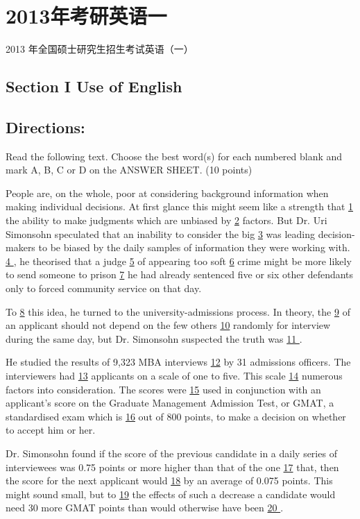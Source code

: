 \documentclass[UTF8,11pt]{ctexart}
\begin{document}
\section*{2013年考研英语一}
2013 年全国硕士研究生招生考试英语（一）


\subsection*{\textbf{Section I Use of English}}


\subsection*{\textbf{Directions:}}


Read the following text. Choose the best word(s) for each numbered blank and mark A, B, C or D on the ANSWER SHEET. (10 points)


People are, on the whole, poor at considering background information when making individual decisions. At first glance this might seem like a strength that \uline{1} the ability to make judgments which are unbiased by \uline{2} factors. But Dr. Uri Simonsohn speculated that an inability to consider the big \uline{3} was leading decision-makers to be biased by the daily samples of information they were working with. \uline{4 }, he theorised that a judge \uline{5} of appearing too soft \uline{6} crime might be more likely to send someone to prison \uline{7} he had already sentenced five or six other defendants only to forced community service on that day.


To \uline{8} this idea, he turned to the university-admissions process. In theory, the \uline{9} of an applicant should not depend on the few others \uline{10} randomly for interview during the same day, but Dr. Simonsohn suspected the truth was \uline{11 }.


He studied the results of 9,323 MBA interviews \uline{12} by 31 admissions officers. The interviewers had \uline{13} applicants on a scale of one to five. This scale \uline{14} numerous factors into consideration. The scores were \uline{15} used in conjunction with an applicant’s score on the Graduate Management Admission Test, or GMAT, a standardised exam which is \uline{16} out of 800 points, to make a decision on whether to accept him or her.


Dr. Simonsohn found if the score of the previous candidate in a daily series of interviewees was 0.75 points or more higher than that of the one \uline{17} that, then the score for the next applicant would \uline{18} by an average of 0.075 points. This might sound small, but to \uline{19} the effects of such a decrease a candidate would need 30 more GMAT points than would otherwise have been \uline{20 }.
\end{document}
